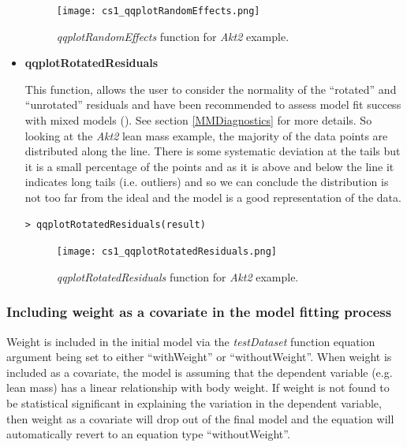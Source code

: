 \documentclass[12pt,a4paper]{article}
\begin{document}
\begin{itemize}
\begin{figure}[H]%
\centerline{\texttt{[image: cs1\_qqplotRandomEffects.png]}}
\caption{\textit{qqplotRandomEffects} function for \textit{Akt2} example.}\label{fig:20}
\end{figure}

\item \textbf{qqplotRotatedResiduals}

This function, allows the user to consider the normality of the ``rotated'' and ``unrotated'' residuals and have been recommended to assess model fit success with mixed models (\cite{RotatedResiduals04}). 
See section \ref{MMDiagnostics} for more details. 
So looking at the \textit{Akt2} lean mass example, the majority of the data points are distributed along the line. 
There is some systematic deviation at the tails but it is a small percentage of the points and as it is above and below the line it indicates long tails (i.e. outliers) 
and so we can conclude the distribution is not too far from the ideal and the model is a good representation of the data. 

\begingroup
    \fontsize{8pt}{12pt}\selectfont
\begin{verbatim}
> qqplotRotatedResiduals(result)
\end{verbatim}
\endgroup 

\begin{figure}[H]%
\centerline{\texttt{[image: cs1\_qqplotRotatedResiduals.png]}}
\caption{\textit{qqplotRotatedResiduals} function for \textit{Akt2} example.}\label{fig:21}
\end{figure}
\end{itemize}

\subsubsection{Including weight as a covariate in the model fitting process}
Weight is included in the initial model via the \textit{testDataset} function equation argument being set to either “withWeight” or “withoutWeight”.  
When weight is included as a covariate, the model is assuming that the dependent variable (e.g. lean mass) has a linear relationship with body weight. 
If weight is not found to be statistical significant in explaining the variation in the dependent variable, 
then weight as a covariate will drop out of the final model and the equation will automatically revert to an equation type “withoutWeight”.  
\end{document}
